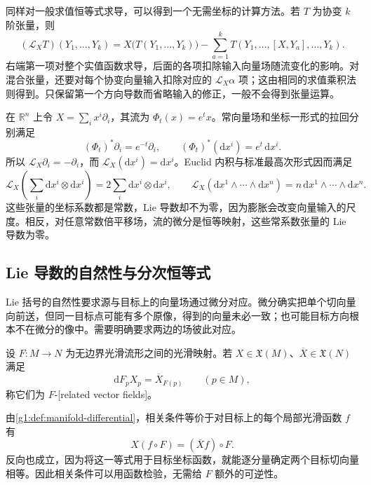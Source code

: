 同样对一般求值恒等式求导，可以得到一个无需坐标的计算方法。若 \(T\) 为协变 \(k\) 阶张量，则
\begin{equation}
	\label{g1:eq:lie-covariant-evaluation}
	(\mathcal L_XT)(Y_1,\ldots,Y_k)
	=X\bigl(T(Y_1,\ldots,Y_k)\bigr)
	-\sum_{a=1}^kT(Y_1,\ldots,[X,Y_a],\ldots,Y_k).
\end{equation}
右端第一项对整个实值函数求导，后面的各项扣除输入向量场随流变化的影响。对混合张量，还要对每个协变向量输入扣除对应的 \(\mathcal L_X\alpha\) 项；这由相同的求值乘积法则得到。只保留第一个方向导数而省略输入的修正，一般不会得到张量运算。

\begin{example}
	\label{g1:exm:lie-dilation-tensors}
	在 \(\mathbb R^n\) 上令 \(X=\sum_i x^i\partial_i\)，其流为 \(\Phi_t(x)=e^t x\)。常向量场和坐标一形式的拉回分别满足
	\[
		(\Phi_t)^*\partial_i=e^{-t}\partial_i,\qquad
		(\Phi_t)^*(\mathrm{d}x^i)=e^t\,\mathrm{d}x^i.
	\]
	所以 \(\mathcal L_X\partial_i=-\partial_i\)，而 \(\mathcal L_X(\mathrm{d}x^i)=\mathrm{d}x^i\)。Euclid 内积与标准最高次形式因而满足
	\[
		\mathcal L_X\left(\sum_i\mathrm{d}x^i\otimes\mathrm{d}x^i\right)
		=2\sum_i\mathrm{d}x^i\otimes\mathrm{d}x^i,\qquad
		\mathcal L_X(\mathrm{d}x^1\wedge\cdots\wedge\mathrm{d}x^n)
		=n\,\mathrm{d}x^1\wedge\cdots\wedge\mathrm{d}x^n.
	\]
	这些张量的坐标系数都是常数，Lie 导数却不为零，因为膨胀会改变向量输入的尺度。相反，对任意常数倍平移场，流的微分是恒等映射，这些常系数张量的 Lie 导数为零。
\end{example}

\subsection{Lie 导数的自然性与分次恒等式}
\label{g1:subsec:1303:04}

Lie 括号的自然性要求源与目标上的向量场通过微分对应。微分确实把单个切向量向前送，但同一目标点可能有多个原像，得到的向量未必一致；也可能目标方向根本不在微分的像中。需要明确要求两边的场彼此对应。

\begin{definition}
	\label{g1:def:related-vector-fields}
	设 \(F:M\to N\) 为无边界光滑流形之间的光滑映射。若 \(X\in\mathfrak X(M)\)、\(\overline X\in\mathfrak X(N)\) 满足
	\[
		\mathrm{d}F_pX_p=\overline X_{F(p)}\qquad(p\in M),
	\]
	称它们为 \(F\)-[related vector fields]。
\end{definition}

由\cref{g1:def:manifold-differential}，相关条件等价于对目标上的每个局部光滑函数 \(f\) 有
\[
	X(f\circ F)=(\overline Xf)\circ F.
\]
反向也成立，因为将这一等式用于目标坐标函数，就能逐分量确定两个目标切向量相等。因此相关条件可以用函数检验，无需给 \(F\) 额外的可逆性。

